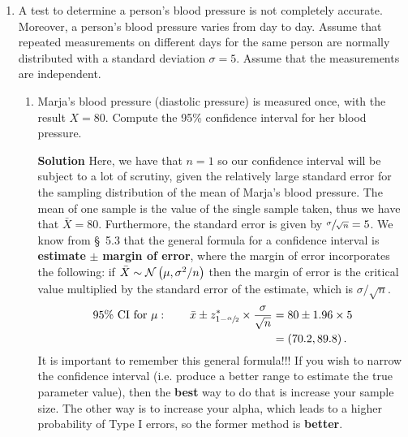 \begin{enumerate}
    \item A test to determine a person’s blood pressure is not completely accurate. Moreover, a person’s blood pressure varies from day to day. Assume that repeated measurements on different days for the same person are normally distributed with a standard deviation $\sigma = 5$. Assume that the measurements are independent.
    \begin{enumerate}
        \item Marja’s blood pressure (diastolic pressure) is measured once, with the result $X = 80$. Compute the 95\% confidence interval for her blood pressure.
        \begin{framed}{\textbf{Solution}}
        Here, we have that $n=1$ so our confidence interval will be subject to a lot of scrutiny, given the relatively large standard error for the sampling distribution of the mean of Marja's blood pressure. The mean of one sample is the value of the single sample taken, thus we have that $\bar{X} = 80$. Furthermore, the standard error is given by $\sfrac{\sigma}{\sqrt{n}} = 5$. We know from \S~5.3 that the general formula for a confidence interval is \textbf{estimate} $\pm$ \textbf{margin of error}, where the margin of error incorporates the following: if $\bar{X} \sim \mathcal{N} \left( \mu, \sigma^2/n\right)$ then the margin of error is the critical value multiplied by the standard error of the estimate, which is $\sigma/\sqrt{n}$.
        \begin{align}
            \text{95\% CI for } \mu : \qquad \bar{x} \pm z^*_{1 - \sfrac{\alpha}{2}} \times \frac{\sigma}{\sqrt{n}} &= 80 \pm 1.96 \times 5 \\
            &= \left( 70.2, 89.8\right).
        \end{align}
        It is important to remember this general formula!!! If you wish to narrow the confidence interval (i.e. produce a better range to estimate the true parameter value), then the \textbf{best} way to do that is increase your sample size. The other way is to increase your alpha, which leads to a higher probability of Type I errors, so the former method is \textbf{better}.
        \end{framed}
        

\end{enumerate}
\end{enumerate}
